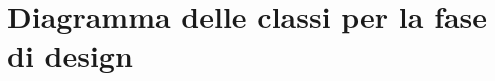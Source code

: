\documentclass[../main.tex]{subfiles}
\begin{document}
\section{Diagramma delle classi per la fase di design}
\figure[H]
\centering

\endfigure
\vfill\newpage
\end{document}
